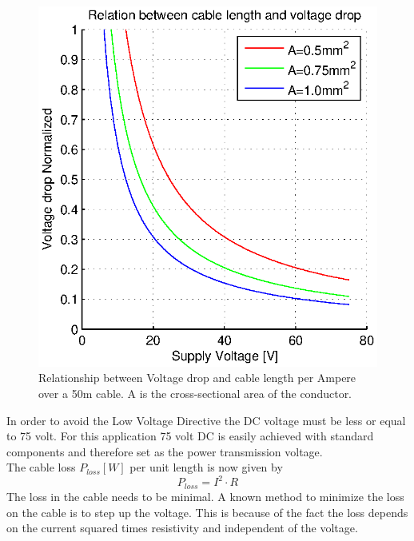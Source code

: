 \begin{figure}[H]
\centering
\includegraphics[scale=0.75]{graphics/matlab/cable_relation_voltage_drop.eps}
\caption[Relationship between Voltage drop and cable length per Ampere]{Relationship between Voltage drop and cable length per Ampere over a 50m cable. A is the cross-sectional area of the conductor.}
\label{fig:relation_voltage_drop}
\end{figure}

\noindent
In order to avoid the Low Voltage Directive \cite{Parliament2006} the DC voltage must be less or equal to 75 volt. For this application 75 volt DC is easily achieved with standard components and therefore set as the power transmission voltage. \\

\noindent
The cable loss $P_{loss}[W]$ per unit length is now given by
\begin{equation}
P_{loss} = I^2 \cdot R
\end{equation}
\noindent
The loss in the cable needs to be minimal. A known method to minimize the loss on the cable is to step up the voltage. This is because of the fact the loss depends on the current squared times resistivity and independent of the voltage. 


